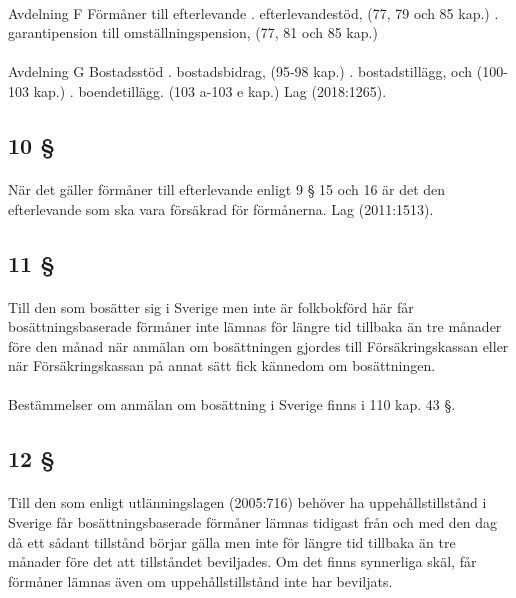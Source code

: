 \documentclass[a4paper,notitlepage,openany,10pt]{book}
\begin{document}
\paragraph*{}
Avdelning F Förmåner till efterlevande
. efterlevandestöd, (77, 79 och 85 kap.)
. garantipension till
omställningspension, (77, 81 och 85 kap.)
\paragraph*{}
Avdelning G Bostadsstöd
. bostadsbidrag, (95-98 kap.)
. bostadstillägg, och (100-103 kap.)
. boendetillägg. (103 a-103 e kap.)
Lag (2018:1265).
\subsection*{10 §}
\paragraph*{}
När det gäller förmåner till efterlevande enligt 9 § 15 och 16 är det den efterlevande som ska vara försäkrad för förmånerna.
Lag (2011:1513).
\subsection*{11 §}
\paragraph*{}
Till den som bosätter sig i Sverige men inte är folkbokförd här får bosättningsbaserade förmåner inte lämnas för längre tid tillbaka än tre månader före den månad när anmälan om bosättningen gjordes till Försäkringskassan eller när Försäkringskassan på annat sätt fick kännedom om bosättningen.
\paragraph*{}
Bestämmelser om anmälan om bosättning i Sverige finns i 110 kap. 43 §.
\subsection*{12 §}
\paragraph*{}
Till den som enligt utlänningslagen (2005:716) behöver ha uppehållstillstånd i Sverige får bosättningsbaserade förmåner lämnas tidigast från och med den dag då ett sådant tillstånd börjar gälla men inte för längre tid tillbaka än tre månader före det att tillståndet beviljades. Om det finns synnerliga skäl, får förmåner lämnas även om uppehållstillstånd inte har beviljats.
\end{document}
